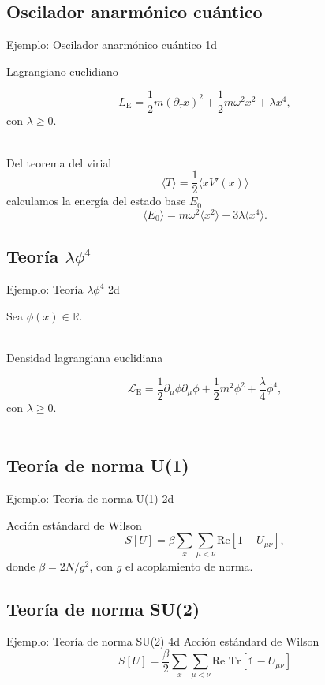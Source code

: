 \documentclass[11pt]{beamer}
\begin{document}
\subsection{Oscilador anarmónico cuántico}
\begin{frame}{Ejemplo: Oscilador anarmónico cuántico 1d}

    Lagrangiano euclidiano

    $$ L_{\text{E}} = \frac{1}{2}m\left(\partial_{\tau}x\right)^2 + \frac{1}{2}m\omega^2 x^2 + \lambda x^4,$$
con $\lambda \ge 0$. \\~

Del teorema del virial 
$$\langle T \rangle = \frac{1}{2}\langle x V'(x) \rangle$$
calculamos la energía del estado base $E_0$ 
$$ \langle E_0 \rangle = m\omega^2\langle x^2 \rangle + 3\lambda \langle x^4 \rangle. $$
\end{frame}


\subsection{Teoría $\lambda \phi^4$}
\begin{frame}{Ejemplo: Teoría $\lambda \phi^4$ 2d}

Sea $\phi(x)\in\mathbb{R}$.\\~

Densidad lagrangiana euclidiana

    $$ \mathcal{L}_{\text{E}} = \frac{1}{2}\partial_{\mu} \phi \partial_{\mu}\phi + \frac{1}{2}m^2  \phi^2 + \frac{\lambda}{4} \phi^4,$$
    con $\lambda \ge 0$. \\~
\end{frame}

\subsection{Teoría de norma U(1)}
\begin{frame}{Ejemplo: Teoría de norma U(1) 2d}

Acción estándard de Wilson
$$ S[U] = \beta\sum_{x}\sum_{\mu < \nu} \text{Re} \left[1 - U_{\mu\nu} \right], $$
donde $\beta = 2N/g^2$, con $g$ el acoplamiento de norma. 
\end{frame}

\subsection{Teoría de norma SU(2)}
\begin{frame}{Ejemplo: Teoría de norma SU(2) 4d}
Acción estándard de Wilson
$$ S[U] = \frac{\beta}{2}\sum_{x}\sum_{\mu < \nu} \text{Re Tr} \left[\mathds{1} - U_{\mu\nu} \right] $$
\end{frame}
\end{document}
